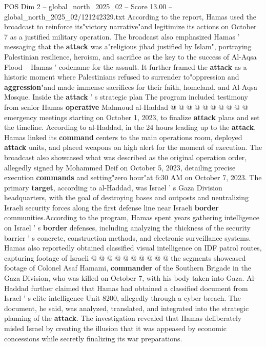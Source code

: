 \begin{textsample}{POS Dim 2 – global\_north\_2025\_02 – Score 13.00 – global\_north\_2025\_02/121242329.txt}
According to the report, Hamas used the broadcast to reinforce its"victory narrative"and legitimize its actions on October 7 as a justified military operation.
The broadcast also emphasized Hamas ' messaging that the \textbf{attack} was a"religious jihad justified by Islam", portraying Palestinian resilience, heroism, and sacrifice as the key to the success of Al-Aqsa Flood -- Hamas ' codename for the assault.
It further framed the \textbf{attack} as a historic moment where Palestinians refused to surrender to"oppression and \textbf{aggression}"and made immense sacrifices for their faith, homeland, and Al-Aqsa Mosque.
Inside the \textbf{attack} ' s strategic plan The program included testimony from senior Hamas \textbf{operative} Mahmoud al-Haddad @ @ @ @ @ @ @ @ @ @ emergency meetings starting on October 1, 2023, to finalize \textbf{attack} plans and set the timeline.
According to al-Haddad, in the 24 hours leading up to the \textbf{attack}, Hamas linked its \textbf{command} centers to the main operations room, deployed \textbf{attack} units, and placed weapons on high alert for the moment of execution.
The broadcast also showcased what was described as the original operation order, allegedly signed by Mohammed Deif on October 5, 2023, detailing precise execution \textbf{commands} and setting"zero hour"at 6:30 AM on October 7, 2023.
The primary \textbf{target}, according to al-Haddad, was Israel ' s Gaza Division headquarters, with the goal of destroying bases and outposts and neutralizing Israeli security forces along the first defense line near Israeli \textbf{border} communities.According to the program, Hamas spent years gathering intelligence on Israel ' s \textbf{border} defenses, including analyzing the thickness of the security barrier ' s concrete, construction methods, and electronic surveillance systems.
Hamas also reportedly obtained classified visual intelligence on IDF patrol routes, capturing footage of Israeli @ @ @ @ @ @ @ @ @ @ the segments showcased footage of Colonel Asaf Hamami, \textbf{commander} of the Southern Brigade in the Gaza Division, who was killed on October 7, with his body taken into Gaza.
Al-Haddad further claimed that Hamas had obtained a classified document from Israel ' s elite intelligence Unit 8200, allegedly through a cyber breach.
The document, he said, was analyzed, translated, and integrated into the strategic planning of the \textbf{attack}.
The investigation revealed that Hamas deliberately misled Israel by creating the illusion that it was appeased by economic concessions while secretly finalizing its war preparations.

\end{textsample}
